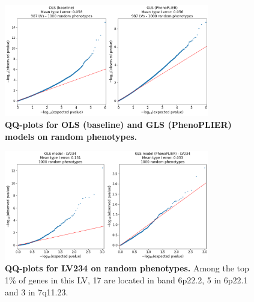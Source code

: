 \documentclass[
  a4paper,
]{article}
\newenvironment{fignos:tagged-figure}[1][]{
  \let\oldfigurename\figurename
  \renewcommand{\figurename}{Supplementary Figure}
}{
  \let\figurename\oldfigurename
}
\begin{document}
\begin{fignos:tagged-figure}[S1]

\begin{figure}
\hypertarget{fig:reg:nulls:qqplots}{%
\centering
\includegraphics[width=0.8\textwidth,height=\textheight]{images/gls/null_sims/models_qqplots.png}
\caption{\textbf{QQ-plots for OLS (baseline) and GLS (PhenoPLIER) models on random phenotypes.}}\label{fig:reg:nulls:qqplots}
}
\end{figure}

\end{fignos:tagged-figure}

\begin{fignos:tagged-figure}[S2]

\begin{figure}
\hypertarget{fig:reg:nulls:qqplot:lv234}{%
\centering
\includegraphics[width=0.8\textwidth,height=\textheight]{images/gls/null_sims/models_lv234.png}
\caption{\textbf{QQ-plots for LV234 on random phenotypes.}
Among the top 1\% of genes in this LV, 17 are located in band 6p22.2, 5 in 6p22.1 and 3 in 7q11.23.}\label{fig:reg:nulls:qqplot:lv234}
}
\end{figure}

\end{fignos:tagged-figure}
\end{document}
